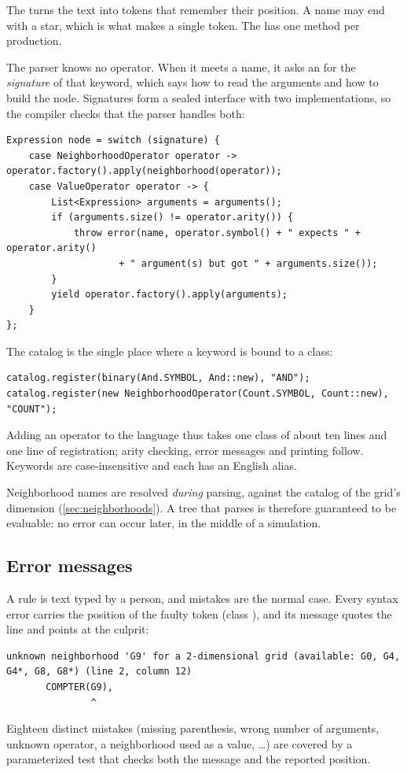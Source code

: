 The  turns the text into tokens that remember their position. A name may end with a
star, which is what makes  a single token. The  has one method per
production.

The parser knows no operator. When it meets a name, it asks an  for the
\emph{signature} of that keyword, which says how to read the arguments and how to build the
node. Signatures form a sealed interface with two implementations, so the compiler checks that
the parser handles both:

\begin{lstlisting}
Expression node = switch (signature) {
    case NeighborhoodOperator operator -> operator.factory().apply(neighborhood(operator));
    case ValueOperator operator -> {
        List<Expression> arguments = arguments();
        if (arguments.size() != operator.arity()) {
            throw error(name, operator.symbol() + " expects " + operator.arity()
                    + " argument(s) but got " + arguments.size());
        }
        yield operator.factory().apply(arguments);
    }
};
\end{lstlisting}

The catalog is the single place where a keyword is bound to a class:

\begin{lstlisting}
catalog.register(binary(And.SYMBOL, And::new), "AND");
catalog.register(new NeighborhoodOperator(Count.SYMBOL, Count::new), "COUNT");
\end{lstlisting}

Adding an operator to the language thus takes one class of about ten lines and one line of
registration; arity checking, error messages and printing follow. Keywords are case-insensitive
and each has an English alias.

Neighborhood names are resolved \emph{during} parsing, against the catalog of the grid's
dimension (\cref{sec:neighborhoods}). A tree that parses is therefore guaranteed to be
evaluable: no error can occur later, in the middle of a simulation.

\subsection{Error messages}

A rule is text typed by a person, and mistakes are the normal case. Every syntax error carries
the position of the faulty token (class ), and its message quotes the
line and points at the culprit:

\begin{lstlisting}[style=text]
unknown neighborhood 'G9' for a 2-dimensional grid (available: G0, G4, G4*, G8, G8*) (line 2, column 12)
       COMPTER(G9),
               ^
\end{lstlisting}

Eighteen distinct mistakes (missing parenthesis, wrong number of arguments, unknown operator, a
neighborhood used as a value, \ldots) are covered by a parameterized test that checks both the
message and the reported position.
